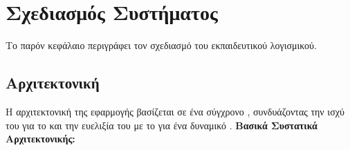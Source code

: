 \section{Σχεδιασμός Συστήματος}
\label{sec:sxediasmos_systimatos}
Το παρόν κεφάλαιο περιγράφει τον σχεδιασμό του εκπαιδευτικού λογισμικού.

\subsection{Αρχιτεκτονική}
\label{sec:arxitektoniki}
Η αρχιτεκτονική της εφαρμογής βασίζεται σε ένα σύγχρονο , συνδυάζοντας την ισχύ του  για το  και την ευελιξία του  με το  για ένα δυναμικό .
\textbf{Βασικά Συστατικά Αρχιτεκτονικής:}
